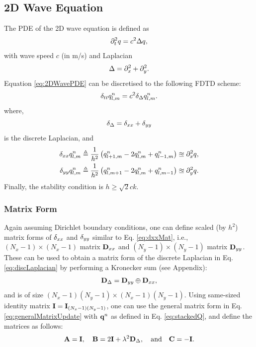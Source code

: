 \documentclass[fleqn]{jaes}
\begin{document}
\subsection{2D Wave Equation}
The PDE of the 2D wave equation is defined as
\begin{equation}\label{eq:2DWavePDE}
    \ptt q = c^2 \Delta q,
\end{equation}
with wave speed $c$ (in m/s) and Laplacian
\begin{equation}
    \Delta = \partial_x^2 + \partial_y^2.
\end{equation}
Equation \eqref{eq:2DWavePDE} can be discretised to the following FDTD scheme:
\begin{equation}\label{eq:2DWaveFDS}
    \dtt \qlmn = c^2 \dDelta \qlmn.
\end{equation}
where,
\begin{equation}\label{eq:discLaplacian}
    \dDelta = \dxx + \dyy
\end{equation}
is the discrete Laplacian, and 
\begin{subequations}
\begin{align}
    \delta_{xx} q_{l,m}^n &\triangleq \frac{1}{h^2}\left(q_{l+1,m}^n - 2 q_{l,m}^n + q_{l-1,m}^n\right)\approxeq \partial_x^2 q,\\
    \delta_{yy} q_{l,m}^n &\triangleq \frac{1}{h^2}\left(q_{l,m+1}^n - 2 q_{l,m}^n + q_{l,m-1}^n\right)\approxeq \partial_y^2 q.
\end{align}
\end{subequations}
Finally, the stability condition is $h \geq \sqrt{2}c k$.

\subsubsection{Matrix Form}
Again assuming Dirichlet boundary conditions, one can define scaled (by $h^2$) matrix forms of $\delta_{xx}$ and $\delta_{yy}$ similar to Eq. \eqref{eq:dxxMat}, i.e., $(N_x-1)\times(N_x-1)$ matrix $\mathbf{D}_{xx}$ and $(N_y-1)\times(N_y-1)$ matrix $\mathbf{D}_{yy}$. These can be used to obtain a matrix form of the discrete Laplacian in Eq. \eqref{eq:discLaplacian} by performing a Kronecker sum \cite{Horn1991} (see Appendix):
\begin{equation}\label{eq:kroneckerSum}
    \DDeltamat = \Dyy \oplus \Dxx,
\end{equation}
and is of size $(N_x-1)(N_y-1)\times (N_x-1)(N_y-1)$.
%
Using same-sized identity matrix $\mathbf{I} = \mathbf{I}_{(N_x-1)(N_y-1)}$, one can use the general matrix form in Eq. \eqref{eq:generalMatrixUpdate} with $\mathbf{q}^n$ as defined in Eq. \eqref{eq:stackedQ}, and define the matrices as follows:
\begin{equation}
    \A = \I, \quad \B = 2\I + \lambda^2 \DDeltamat, \qaq \C = -\I.
\end{equation}
\end{document}
